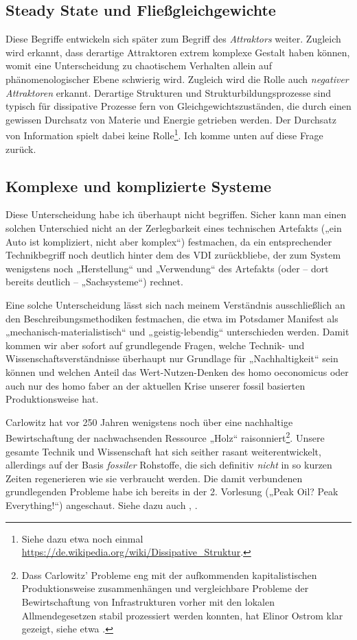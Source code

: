 \documentclass[11pt,a4paper]{article}
\begin{document}
\subsection{Steady State und Fließgleichgewichte}

Diese Begriffe entwickeln sich später zum Begriff des \emph{Attraktors}
weiter.  Zugleich wird erkannt, dass derartige Attraktoren extrem komplexe
Gestalt haben können, womit eine Unterscheidung zu chaotischem Verhalten
allein auf phänomenologischer Ebene schwierig wird.  Zugleich wird die Rolle
auch \emph{negativer Attraktoren} erkannt.  Derartige Strukturen und
Strukturbildungsprozesse sind typisch für dissipative Prozesse fern von
Gleichgewichtszuständen, die durch einen gewissen Durchsatz von Materie und
Energie getrieben werden. Der Durchsatz von Information spielt dabei keine
Rolle\footnote{Siehe dazu etwa noch einmal
  \url{https://de.wikipedia.org/wiki/Dissipative_Struktur}.}. Ich komme unten
auf diese Frage zurück.

\subsection{Komplexe und komplizierte Systeme}

Diese Unterscheidung habe ich überhaupt nicht begriffen. Sicher kann man einen
solchen Unterschied nicht an der Zerlegbarkeit eines technischen Artefakts
(„ein Auto ist kompliziert, nicht aber komplex“) festmachen, da ein
entsprechender Technikbegriff noch deutlich hinter dem des VDI
\cite{VDITechnik} zurückbliebe, der zum System wenigstens noch „Herstellung“
und „Verwendung“ des Artefakts (oder -- dort bereits deutlich --
„Sachsysteme“) rechnet.

Eine solche Unterscheidung lässt sich nach meinem Verständnis ausschließlich
an den Beschreibungsmethodiken festmachen, die etwa im Potsdamer Manifest
\cite{VDW2005} als „mechanisch-materialistisch“ und „geistig-lebendig“
unterschieden werden.  Damit kommen wir aber sofort auf grundlegende Fragen,
welche Technik- und Wissenschaftsverständnisse überhaupt nur Grundlage für
„Nachhaltigkeit“ sein können und welchen Anteil das Wert-Nutzen-Denken des
homo oeconomicus oder auch nur des homo faber an der aktuellen Krise unserer
fossil basierten Produktionsweise hat.

Carlowitz hat vor 250 Jahren wenigstens noch über eine nachhaltige
Bewirtschaftung der nachwachsenden Ressource „Holz“ raisonniert\footnote{Dass
  Carlowitz' Probleme eng mit der aufkommenden kapitalistischen
  Produktionsweise zusammenhängen und vergleichbare Probleme der
  Bewirtschaftung von Infrastrukturen vorher mit den lokalen Allmendegesetzen
  stabil prozessiert werden konnten, hat Elinor Ostrom klar gezeigt, siehe
  etwa \cite{Stollorz2011}. }. Unsere gesamte Technik und Wissenschaft hat
sich seither rasant weiterentwickelt, allerdings auf der Basis \emph{fossiler}
Rohstoffe, die sich definitiv \emph{nicht} in so kurzen Zeiten regenerieren
wie sie verbraucht werden.  Die damit verbundenen grundlegenden Probleme habe
ich bereits in der 2. Vorlesung („Peak Oil? Peak Everything!“) angeschaut.
Siehe dazu auch \cite{Davis2008}, \cite{Graebe2012}.
\end{document}

